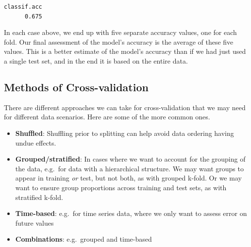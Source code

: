 \documentclass[
  letterpaper,
]{krantz}
\newenvironment{Shaded}{}{}
\newcommand{\CommentTok}[1]{\textcolor[rgb]{0.38,0.63,0.69}{\textit{#1}}}
\newcommand{\FunctionTok}[1]{\textcolor[rgb]{0.02,0.16,0.49}{#1}}
\newcommand{\NormalTok}[1]{#1}
\newcommand{\SpecialCharTok}[1]{\textcolor[rgb]{0.25,0.44,0.63}{#1}}
\newcommand{\StringTok}[1]{\textcolor[rgb]{0.25,0.44,0.63}{#1}}
\providecommand{\tightlist}{%
  \setlength{\itemsep}{0pt}\setlength{\parskip}{0pt}}\usepackage{longtable,booktabs,array}
\begin{document}
\begin{Shaded}
\end{Shaded}

\begin{verbatim}
classif.acc 
      0.675 
\end{verbatim}

In each case above, we end up with five separate accuracy values, one
for each fold. Our final assessment of the model's accuracy is the
average of these five values. This is a better estimate of the model's
accuracy than if we had just used a single test set, and in the end it
is based on the entire data.

\subsection{Methods of
Cross-validation}\label{methods-of-cross-validation}

There are different approaches we can take for cross-validation that we
may need for different data scenarios. Here are some of the more common
ones.

\begin{itemize}
\tightlist
\item
  \textbf{Shuffled}: Shuffling prior to splitting can help avoid data
  ordering having undue effects.
\item
  \textbf{Grouped/stratified}: In cases where we want to account for the
  grouping of the data, e.g.~for data with a hierarchical structure. We
  may want groups to appear in training \emph{or} test, but not both, as
  with grouped k-fold. Or we may want to ensure group proportions across
  training and test sets, as with stratified k-fold.
\item
  \textbf{Time-based}: e.g.~for time series data, where we only want to
  assess error on future values
\item
  \textbf{Combinations}: e.g.~grouped and time-based
\end{itemize}
\end{document}
